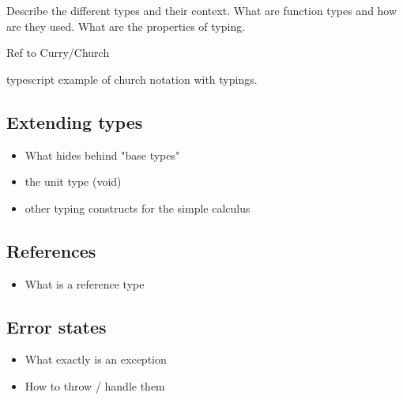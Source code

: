 


Describe the different types and their context.
What are function types and how are they used.
What are the properties of typing.

Ref to Curry/Church

typescript example of church notation with typings.


\subsection{Extending types}

\begin{itemize}
    \item What hides behind "base types"
    \item the unit type (void)
    \item other typing constructs for the simple calculus
\end{itemize}

\subsection{References}

\begin{itemize}
    \item What is a reference type
\end{itemize}

\subsection{Error states}

\begin{itemize}
    \item What exactly is an exception
    \item How to throw / handle them
\end{itemize}
